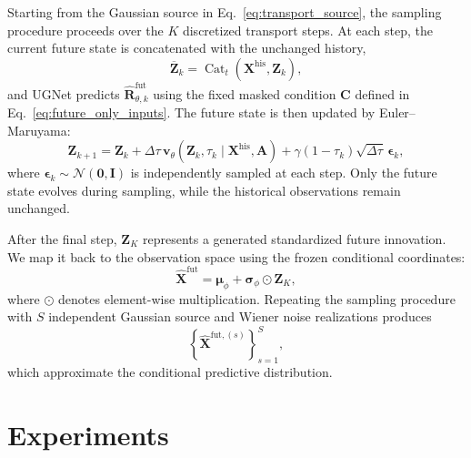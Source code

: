 \documentclass[sigconf, anonymous, review]{acmart}
\begin{document}
Starting from the Gaussian source in
Eq.~\eqref{eq:transport_source}, the sampling procedure proceeds over
the $K$ discretized transport steps. At each step, the current future
state is concatenated with the unchanged history,
%
\begin{equation}
\overline{\mathbf{Z}}_{k}
=
\operatorname{Cat}_{t}
\left(
\mathbf{X}^{\mathrm{his}},
\mathbf{Z}_{k}
\right),
\label{eq:sampling_input}
\end{equation}
%
and UGNet predicts
$\widehat{\mathbf{R}}_{\theta,k}^{\mathrm{fut}}$
using the fixed masked condition $\mathbf{C}$ defined in
Eq.~\eqref{eq:future_only_inputs}. The future state is then updated by
Euler--Maruyama:
%
\begin{equation}
\mathbf{Z}_{k+1}
=
\mathbf{Z}_{k}
+
\Delta\tau\,
\mathbf{v}_{\theta}
\left(
\mathbf{Z}_{k},\tau_k
\mid
\mathbf{X}^{\mathrm{his}},\mathbf{A}
\right)
+
\gamma(1-\tau_k)
\sqrt{\Delta\tau}\,
\boldsymbol{\epsilon}_{k},
\label{eq:euler_maruyama}
\end{equation}
%
where
$\boldsymbol{\epsilon}_{k}
\sim
\mathcal{N}(\mathbf{0},\mathbf{I})$
is independently sampled at each step. Only the future state evolves
during sampling, while the historical observations remain unchanged.

After the final step, $\mathbf{Z}_{K}$ represents a generated
standardized future innovation. We map it back to the observation space
using the frozen conditional coordinates:
%
\begin{equation}
\widehat{\mathbf{X}}^{\mathrm{fut}}
=
\boldsymbol{\mu}_{\phi}
+
\boldsymbol{\sigma}_{\phi}
\odot
\mathbf{Z}_{K},
\label{eq:inverse_coordinate_transform}
\end{equation}
%
where $\odot$ denotes element-wise multiplication. Repeating the
sampling procedure with $S$ independent Gaussian source and Wiener
noise realizations produces
%
\begin{equation}
\left\{
\widehat{\mathbf{X}}^{\mathrm{fut},(s)}
\right\}_{s=1}^{S},
\label{eq:forecast_samples}
\end{equation}
%
which approximate the conditional predictive distribution.

\section{Experiments}
\label{sec:experiments}
\end{document}

